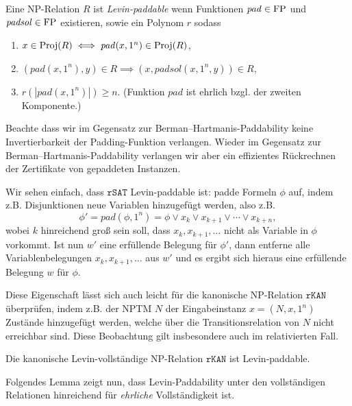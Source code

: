 \begin{definition}\label{def:levin-paddable}
    Eine NP-Relation $R$ ist \emph{Levin-paddable} wenn 
    Funktionen $\mathit{pad}\in\mathrm{FP}$ und $\mathit{padsol}\in\mathrm{FP}$ existieren, sowie ein Polynom $r$ sodass
    \begin{enumerate}
        \item $x\in \operatorname{Proj}(R) \iff \mathit{pad}(x, 1^n) \in \operatorname{Proj}(R)$,
        \item $(\mathit{pad}(x, 1^n), y)\in R \implies (x, \mathit{padsol}(x, 1^n, y)) \in R$,
        \item $r(|\mathit{pad}(x, 1^n)|)\geq n$. (Funktion $\mathit{pad}$ ist ehrlich bzgl. der zweiten Komponente.)\qedhere
    \end{enumerate}
\end{definition}
Beachte dass wir im Gegensatz zur Berman–Hartmanis-Paddability keine Invertierbarkeit der Padding-Funktion verlangen. Wieder im Gegensatz zur Berman–Hartmanis-Paddability verlangen wir aber ein effizientes Rückrechnen der Zertifikate von gepaddeten Instanzen.

Wir sehen einfach, dass $\mathtt{rSAT}$ Levin-paddable ist: padde Formeln $\phi$ auf, indem z.B. Disjunktionen neue Variablen hinzugefügt werden, also z.B. 
\[ \phi' = \mathit{pad}(\phi, 1^n) = \phi \lor x_k \lor x_{k+1} \lor \cdots \lor x_{k+n}, \]
wobei $k$ hinreichend groß sein soll, dass $x_k, x_{k+1}, \dots$ nicht als Variable in $\phi$ vorkommt.
Ist nun $w'$ eine erfüllende Belegung für $\phi'$, dann entferne alle Variablenbelegungen $x_{k}, x_{k+1}, \dots$ aus $w'$ und es ergibt sich hieraus eine erfüllende Belegung $w$ für $\phi$.

Diese Eigenschaft lässt sich auch leicht für die kanonische NP-Relation $\mathtt{rKAN}$ überprüfen, 
indem z.B. der NPTM $N$ der Eingabeinstanz $x=(N, x, 1^n)$ Zustände hinzugefügt werden, welche über die Transitionsrelation von $N$ nicht erreichbar sind.
Diese Beobachtung gilt insbesondere auch im relativierten Fall.
\begin{observation}\label{obs:rkan-paddable}
    Die kanonische Levin-vollständige NP-Relation $\mathtt{rKAN}$ ist Levin-paddable.
\end{observation}

Folgendes Lemma zeigt nun, dass Levin-Paddability unter den vollständigen Relationen hinreichend für \emph{ehrliche} Vollständigkeit ist.

